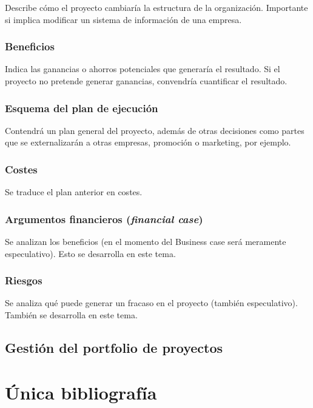 \documentclass[12pt]{article}
\begin{document}
{Describe cómo el proyecto cambiaría la estructura de la organización. Importante si implica modificar un sistema de información de una empresa.}

\subsubsection{Beneficios}
\label{2.2.5}

{Indica las ganancias o ahorros potenciales que generaría el resultado. Si el proyecto no pretende generar ganancias, convendría cuantificar el resultado.}

\subsubsection{Esquema del plan de ejecución}
\label{2.2.6}

{Contendrá un plan general del proyecto, además de otras decisiones como partes que se externalizarán a otras empresas, promoción o marketing, por ejemplo.}

\subsubsection{Costes}
\label{2.2.7}

{Se traduce el plan anterior en costes.}

\subsubsection{Argumentos financieros (\textit{financial case})}
\label{2.2.8}

{Se analizan los beneficios (en el momento del Business case será meramente especulativo). Esto se desarrolla en este tema.}

\subsubsection{Riesgos}
\label{2.2.9}

{Se analiza qué puede generar un fracaso en el proyecto (también especulativo). También se desarrolla en este tema.}

\subsection{Gestión del portfolio de proyectos}
\label{2.3.0}


\newpage
\section{Única bibliografía}
\nocite{*}
\begingroup
\renewcommand{\section}[2]{}%
\printbibliography
\endgroup
\end{document}
